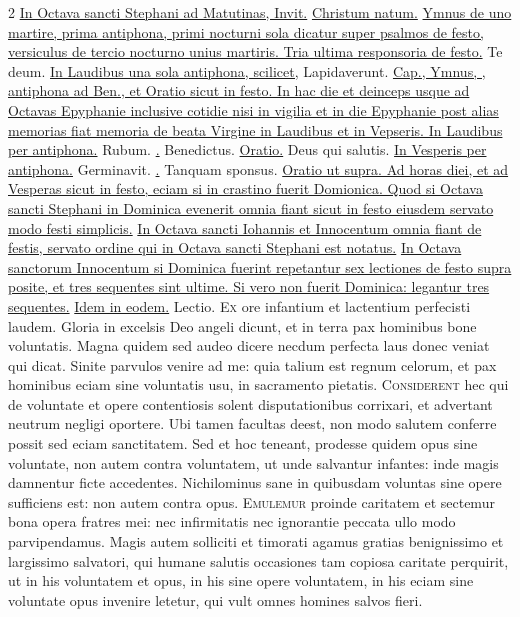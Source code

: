 \begin{multicols*}{2}
\newline \ul{In Octava sancti Stephani ad Matutinas, Invit.} \hyperlink{christum-natum-invitatorium}{Christum natum.} \ul{Ymnus de uno martire, prima antiphona, primi nocturni sola dicatur super psalmos de festo, versiculus de tercio nocturno unius martiris. Tria ultima responsoria de festo.} Te deum. \ul{In Laudibus una sola antiphona, scilicet,} Lapidaverunt. \ul{Cap., Ymnus, \Vbar , antiphona ad Ben., et Oratio sicut in festo. In hac die et deinceps usque ad Octavas Epyphanie inclusive cotidie nisi in vigilia et in die Epyphanie post alias memorias fiat memoria de beata Virgine in Laudibus et in Vepseris. In Laudibus per antiphona.} Rubum. \ul{\Vbar .} Benedictus. \ul{Oratio.} Deus qui salutis. \ul{In Vesperis per antiphona.} Germinavit. \ul{\Vbar .} Tanquam sponsus. \ul{Oratio ut supra. Ad horas diei, et ad Vesperas sicut in festo, eciam si in crastino fuerit Domionica. Quod si Octava sancti Stephani in Dominica evenerit omnia fiant sicut in festo eiusdem servato modo festi simplicis.}
\newline \ul{In Octava sancti Iohannis et Innocentum omnia fiant de festis, servato ordine qui in Octava sancti Stephani est notatus.}
\newline \ul{In Octava sanctorum Innocentum si Dominica fuerint repetantur sex lectiones de festo supra posite, et tres sequentes sint ultime. Si vero non fuerit Dominica: legantur tres sequentes.}
\newline \ul{Idem in eodem.} {\color{Red} Lectio.}
\lettrine[lines=2]{\zallmancaps \color{Red} E}{x} ore infantium et lactentium perfecisti laudem. Gloria in excelsis Deo angeli dicunt, et in terra pax hominibus bone voluntatis. Magna quidem sed audeo dicere necdum perfecta laus donec veniat qui dicat. Sinite parvulos venire ad me: quia talium est regnum celorum, et pax hominibus eciam sine voluntatis usu, in sacramento pietatis.
\lettrine[lines=2]{\zallmancaps \color{Blue} C}{onsiderent} hec qui de voluntate et opere contentiosis solent disputationibus corrixari, et advertant neutrum negligi oportere. Ubi tamen facultas deest, non modo salutem conferre possit sed eciam sanctitatem. Sed et hoc teneant, prodesse quidem opus sine voluntate, non autem contra voluntatem, ut unde salvantur infantes: inde magis damnentur ficte accedentes. Nichilominus sane in quibusdam voluntas sine opere sufficiens est: non autem contra opus.
\lettrine[lines=2]{\zallmancaps \color{Red} E}{mulemur} proinde caritatem et sectemur bona opera fratres mei: nec infirmitatis nec ignorantie peccata ullo modo parvipendamus. Magis autem solliciti et timorati agamus gratias benignissimo et largissimo salvatori, qui humane salutis occasiones tam copiosa caritate perquirit, ut in his voluntatem et opus, in his sine opere voluntatem, in his eciam sine voluntate opus invenire letetur, qui vult omnes homines salvos fieri.

\end{multicols*}
